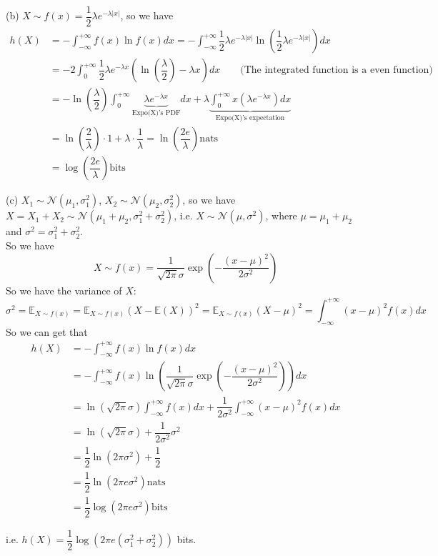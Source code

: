 (b) $X\sim f(x)=\dfrac{1}{2}\lambda e^{-\lambda|x|}$, so we have
\begin{align*}
h(X) &= -\int_{-\infty}^{+\infty} f(x)\ln f(x)dx = -\int_{-\infty}^{+\infty} \dfrac{1}{2}\lambda e^{-\lambda|x|} \ln \left(\dfrac{1}{2}\lambda e^{-\lambda|x|}\right)dx \\
&= -2\int_{0}^{+\infty} \dfrac{1}{2}\lambda e^{-\lambda x} \left(\ln\left(\dfrac{\lambda}{2}\right) -\lambda x\right)dx \qquad \text{(The integrated function is a even function)} \\
&= -\ln\left(\dfrac{\lambda}{2}\right) \int_{0}^{+\infty}\underbrace{ \lambda e^{-\lambda x} }_{\text{Expo(X)'s PDF}}dx + \lambda\underbrace{ \int_{0}^{+\infty} x \left(\lambda e^{-\lambda x}\right) dx}_{\text{Expo(X)'s expectation}} \\
&= \ln\left(\dfrac{2}{\lambda}\right)\cdot 1 + \lambda\cdot \dfrac{1}{\lambda} = \ln\left(\dfrac{2e}{\lambda}\right) \text{nats} \\
&= \log\left(\dfrac{2e}{\lambda}\right) \text{bits}
\end{align*}

(c) $X_1\sim \mathcal{N}(\mu_1, \sigma_1^2)$, $X_2\sim \mathcal{N}(\mu_2, \sigma_2^2)$, so we have $X=X_1+X_2\sim \mathcal{N}(\mu_1+\mu_2, \sigma_1^2+\sigma_2^2)$, i.e. $X\sim \mathcal{N}(\mu, \sigma^2)$, where $\mu=\mu_1+\mu_2$ and $\sigma^2=\sigma_1^2+\sigma_2^2$. \\
So we have
$$X\sim f(x) = \dfrac{1}{\sqrt{2\pi}\sigma} \exp\left(-\dfrac{(x-\mu)^2}{2\sigma^2}\right)$$
So we have the variance of $X$:
$$\sigma^2 = \mathbb{E}_{X\sim f(x)} = \mathbb{E}_{X\sim f(x)}\left(X-\mathbb{E}(X)\right)^2 = \mathbb{E}_{X\sim f(x)}\left(X-\mu\right)^2=\int_{-\infty}^{+\infty} (x-\mu)^2 f(x)dx$$
So we can get that
\begin{align*}
h(X) &= -\int_{-\infty}^{+\infty} f(x)\ln f(x)dx \\
&= -\int_{-\infty}^{+\infty} f(x) \ln \left(\dfrac{1}{\sqrt{2\pi}\sigma} \exp\left(-\dfrac{(x-\mu)^2}{2\sigma^2}\right)\right)dx \\
&= \ln\left(\sqrt{2\pi}\sigma\right)\int_{-\infty}^{+\infty} f(x) dx + \dfrac{1}{2\sigma^2}\int_{-\infty}^{+\infty} (x-\mu)^2 f(x)dx \\
&= \ln\left(\sqrt{2\pi}\sigma\right) + \dfrac{1}{2\sigma^2}\sigma^2 \\
&= \dfrac{1}{2}\ln\left(2\pi\sigma^2\right) + \dfrac{1}{2} \\
&= \dfrac{1}{2}\ln\left(2\pi e\sigma^2\right) \text{nats} \\
&= \dfrac{1}{2}\log\left(2\pi e\sigma^2\right) \text{bits}
\end{align*}

i.e. $h(X) = \dfrac{1}{2}\log\left(2\pi e\left(\sigma_1^2+\sigma_2^2\right)\right)$ bits.

\newpage